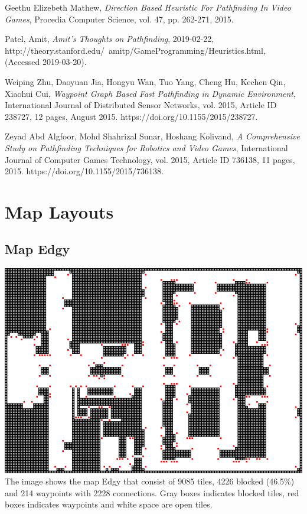 \documentclass[sigconf]{acmart}
\begin{document}
\begin{thebibliography}{9}

  Geethu Elizebeth Mathew,
  \textit{Direction Based Heuristic For Pathfinding In Video Games},
  Procedia Computer Science, vol. 47, pp. 262-271,
  2015.

   Patel, Amit,
  \textit{Amit's Thoughts on Pathfinding},
  2019-02-22,
  http://theory.stanford.edu/~amitp/GameProgramming/\newline Heuristics.html,
  (Accessed 2019-03-20).

  Weiping Zhu, Daoyuan Jia, Hongyu Wan, Tuo Yang, Cheng Hu, Kechen Qin, Xiaohui Cui,
  \textit{Waypoint Graph Based Fast Pathfinding in Dynamic Environment},
  International Journal of Distributed Sensor Networks, vol. 2015, Article ID 238727, 12 pages,
  August 2015. https://doi.org/10.1155/2015/238727.

  Zeyad Abd Algfoor, Mohd Shahrizal Sunar, Hoshang Kolivand,
  \textit{A Comprehensive Study on Pathfinding Techniques for Robotics and Video Games},
  International Journal of Computer Games Technology, vol. 2015, Article ID 736138, 11 pages,
  2015. https://doi.org/10.1155/2015/736138.

\end{thebibliography}

\pagebreak
\appendix

\section{Map Layouts}
\subsection{Map Edgy}\label{ap.edgy}
\includegraphics[scale=0.5]{ChartsAndFigures/Edgy.png}
\newline The image shows the map Edgy that consist of 9085 tiles, 4226 blocked (46.5\%) and 214 waypoints with 2228 connections. Gray boxes indicates blocked tiles, red boxes indicates waypoints and white space are open tiles.
\end{document}
